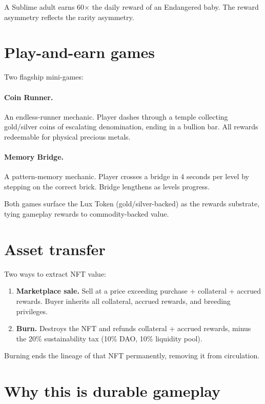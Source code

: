 \documentclass[11pt,letterpaper]{article}
\begin{document}
A Sublime adult earns 60$\times$ the daily reward of an Endangered baby. The reward asymmetry reflects the rarity asymmetry.

\section{Play-and-earn games}

Two flagship mini-games:

\paragraph{Coin Runner.} An endless-runner mechanic. Player dashes through a temple collecting gold/silver coins of escalating denomination, ending in a bullion bar. All rewards redeemable for physical precious metals.

\paragraph{Memory Bridge.} A pattern-memory mechanic. Player crosses a bridge in 4 seconds per level by stepping on the correct brick. Bridge lengthens as levels progress.

Both games surface the Lux Token (gold/silver-backed) as the rewards substrate, tying gameplay rewards to commodity-backed value.

\section{Asset transfer}

Two ways to extract NFT value:

\begin{enumerate}
  \item \textbf{Marketplace sale.} Sell at a price exceeding purchase + collateral + accrued rewards. Buyer inherits all collateral, accrued rewards, and breeding privileges.
  \item \textbf{Burn.} Destroys the NFT and refunds collateral + accrued rewards, minus the 20\% sustainability tax (10\% DAO, 10\% liquidity pool).
\end{enumerate}

Burning ends the lineage of that NFT permanently, removing it from circulation.

\section{Why this is durable gameplay}
\end{document}
